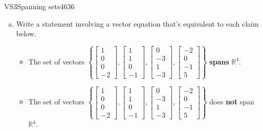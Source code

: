 \begin{exercise}{VS3}{Spanning sets}{4636} 
\begin{exerciseStatement} 

\begin{enumerate}[(a)]
\item  

 Write a statement involving a vector equation that's equivalent to each claim below. 

 

\begin{itemize}
\item  

 The set of vectors \(\left\{ \left[\begin{array}{c}
1 \\
0 \\
0 \\
-2
\end{array}\right] , \left[\begin{array}{c}
1 \\
1 \\
0 \\
-1
\end{array}\right] , \left[\begin{array}{c}
0 \\
-3 \\
1 \\
-3
\end{array}\right] , \left[\begin{array}{c}
-2 \\
0 \\
-1 \\
5
\end{array}\right] \right\}\) \textbf{spans} \(\mathbb R^4\). 

 
\item  

 The set of vectors \(\left\{ \left[\begin{array}{c}
1 \\
0 \\
0 \\
-2
\end{array}\right] , \left[\begin{array}{c}
1 \\
1 \\
0 \\
-1
\end{array}\right] , \left[\begin{array}{c}
0 \\
-3 \\
1 \\
-3
\end{array}\right] , \left[\begin{array}{c}
-2 \\
0 \\
-1 \\
5
\end{array}\right] \right\}\) does \textbf{not} span \(\mathbb R^4\). 


\end{itemize}
\end{enumerate}
\end{exerciseStatement}
\end{exercise}

